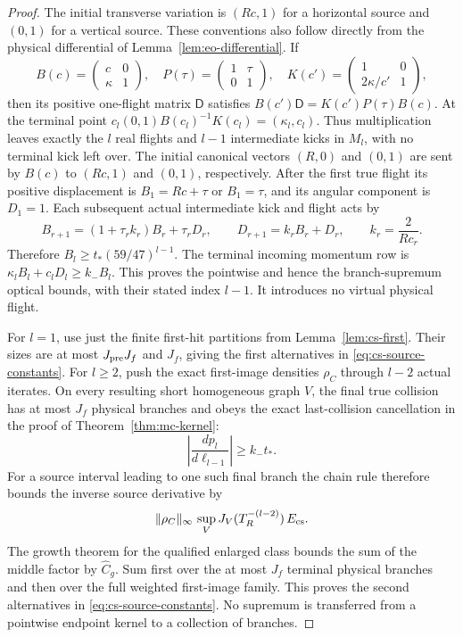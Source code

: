 \begin{proof}
The initial transverse variation is $(Rc,1)$ for a horizontal
source and $(0,1)$ for a vertical source.  These conventions also
follow directly from the physical differential of
Lemma~\ref{lem:eo-differential}.  If
\[
 B(c)=\begin{pmatrix}c&0\\\kappa&1\end{pmatrix},\quad
 P(\tau)=\begin{pmatrix}1&\tau\\0&1\end{pmatrix},\quad
 K(c')=\begin{pmatrix}1&0\\2\kappa/c'&1\end{pmatrix},
\]
then its positive one-flight matrix $\mathsf D$ satisfies
$B(c')\mathsf D=K(c')P(\tau)B(c)$.  At the terminal point
$c_l(0,1)B(c_l)^{-1}K(c_l)=(\kappa_l,c_l)$.
Thus multiplication leaves exactly the $l$ real flights and
$l-1$ intermediate kicks in $M_l$, with no terminal kick left
over.  The initial canonical vectors $(R,0)$ and $(0,1)$ are
sent by $B(c)$ to $(Rc,1)$ and $(0,1)$, respectively.
After the first true flight
its positive displacement is $B_1=Rc+\tau$ or $B_1=\tau$, and
its angular component is $D_1=1$.  Each subsequent actual
intermediate kick and flight acts by
\[
 B_{r+1}=(1+\tau_r k_r)B_r+\tau_r D_r,\qquad
 D_{r+1}=k_rB_r+D_r,\qquad
 k_r=\frac2{R c_r}.
\]
Therefore $B_l\ge t_*(59/47)^{l-1}$.  The terminal incoming
momentum row is $\kappa_l B_l+c_lD_l\ge k_-B_l$.
This proves the pointwise and hence the branch-supremum optical
bounds, with their stated index $l-1$.  It introduces no virtual
physical flight.

For $l=1$, use just the finite first-hit partitions from
Lemma~\ref{lem:cs-first}.  Their sizes are at most
$J_{\rm pre}J_f$ and $J_f$, giving the first alternatives in
\eqref{eq:cs-source-constants}.  For $l\ge2$, push the exact
first-image densities $\rho_C$ through $l-2$ actual iterates.
On every resulting short homogeneous graph $V$, the final true
collision has at most $J_f$ physical branches and obeys the exact
last-collision cancellation in the proof of
Theorem~\ref{thm:mc-kernel}:
\[
       \left|\frac{dp_l}{d\ell_{l-1}}\right|\ge k_-t_*.
\]
For a source interval leading to one such final branch the chain
rule therefore bounds the inverse source derivative by
\[
 \|\rho_C\|_\infty\,
          \sup_VJ_V(T_R^{-(l-2)})\,E_{\rm cs}.
\]
The growth theorem for the qualified enlarged class bounds the sum
of the middle factor by $\widehat C_g$.  Sum first over the at most
$J_f$ terminal physical branches and then over the full weighted
first-image family.  This proves the second alternatives in
\eqref{eq:cs-source-constants}.  No supremum is transferred from a
pointwise endpoint kernel to a collection of branches.


\end{proof}
